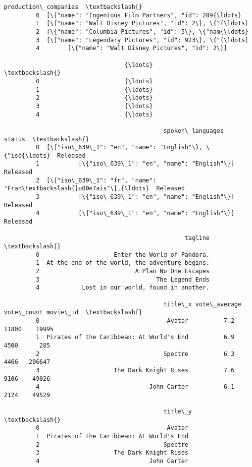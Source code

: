 \documentclass[11pt]{article}
\begin{document}
\begin{Verbatim}[commandchars=\\\{\}]
                                         production\_companies  \textbackslash{}
         0  [\{"name": "Ingenious Film Partners", "id": 289{\ldots}   
         1  [\{"name": "Walt Disney Pictures", "id": 2\}, \{"{\ldots}   
         2  [\{"name": "Columbia Pictures", "id": 5\}, \{"nam{\ldots}   
         3  [\{"name": "Legendary Pictures", "id": 923\}, \{"{\ldots}   
         4        [\{"name": "Walt Disney Pictures", "id": 2\}]   
         
                                  {\ldots}                          \textbackslash{}
         0                        {\ldots}                           
         1                        {\ldots}                           
         2                        {\ldots}                           
         3                        {\ldots}                           
         4                        {\ldots}                           
         
                                             spoken\_languages    status  \textbackslash{}
         0  [\{"iso\_639\_1": "en", "name": "English"\}, \{"iso{\ldots}  Released   
         1           [\{"iso\_639\_1": "en", "name": "English"\}]  Released   
         2  [\{"iso\_639\_1": "fr", "name": "Fran\textbackslash{}u00e7ais"\},{\ldots}  Released   
         3           [\{"iso\_639\_1": "en", "name": "English"\}]  Released   
         4           [\{"iso\_639\_1": "en", "name": "English"\}]  Released   
         
                                                   tagline  \textbackslash{}
         0                     Enter the World of Pandora.   
         1  At the end of the world, the adventure begins.   
         2                           A Plan No One Escapes   
         3                                 The Legend Ends   
         4            Lost in our world, found in another.   
         
                                             title\_x vote\_average vote\_count movie\_id  \textbackslash{}
         0                                    Avatar          7.2      11800    19995   
         1  Pirates of the Caribbean: At World's End          6.9       4500      285   
         2                                   Spectre          6.3       4466   206647   
         3                     The Dark Knight Rises          7.6       9106    49026   
         4                               John Carter          6.1       2124    49529   
         
                                             title\_y  \textbackslash{}
         0                                    Avatar   
         1  Pirates of the Caribbean: At World's End   
         2                                   Spectre   
         3                     The Dark Knight Rises   
         4                               John Carter   
         

\end{Verbatim}
\end{document}

